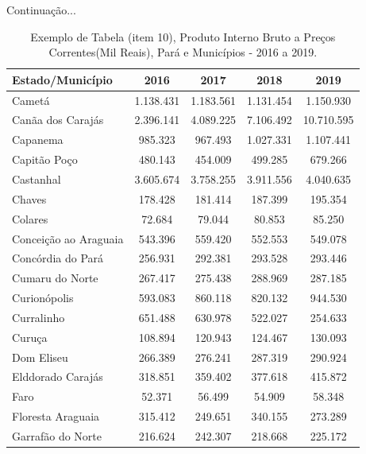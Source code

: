 \newpage
\begin{table}[!htb]
    \centering
    {
    \caption{Exemplo de Tabela (item 10), Produto Interno Bruto a Preços Correntes(Mil Reais), Pará e Municípios - 2016 a 2019.}  Continuação...
    \label{item 10 regras2}
    \vspace{0.1cm}
\begin{tabular}{l|c|c|c|c}
  \hline\hline
  Estado/Município        &    2016    &    2017   &    2018   &  2019       \\
  \hline\hline
   Cametá                 &  1.138.431 & 1.183.561 & 1.131.454 & 1.150.930    \\
   Canãa dos Carajás      &  2.396.141 & 4.089.225 & 7.106.492 & 10.710.595   \\
   Capanema               &  985.323   & 967.493   & 1.027.331 & 1.107.441    \\
   Capitão Poço           &  480.143   & 454.009   & 499.285   & 679.266      \\ 
   Castanhal              &  3.605.674 & 3.758.255 & 3.911.556 & 4.040.635    \\
   Chaves                 &  178.428   & 181.414   & 187.399   & 195.354      \\
   Colares                &  72.684    & 79.044    & 80.853    &  85.250     \\
   Conceição ao Araguaia  &  543.396   & 559.420   & 552.553   &  549.078    \\
   Concórdia do Pará      &  256.931   & 292.381   & 293.528   &  293.446    \\
   Cumaru do Norte        &  267.417   & 275.438   & 288.969   &  287.185    \\
   Curionópolis           & 593.083    & 860.118   & 820.132   &  944.530    \\
   Curralinho             & 651.488    &  630.978  &  522.027  &  254.633    \\
   Curuça                 & 108.894    &  120.943  &  124.467  & 130.093     \\
   Dom Eliseu             & 266.389    &  276.241  & 287.319   & 290.924     \\
   Elddorado Carajás      & 318.851    &  359.402  &  377.618  & 415.872     \\
   Faro                   & 52.371     &  56.499   & 54.909    & 58.348      \\
   Floresta  Araguaia     & 315.412    &  249.651  & 340.155   &  273.289   \\
   Garrafão do Norte      & 216.624    &  242.307  &  218.668  &  225.172  \\

\end{tabular}}
\end{table}
